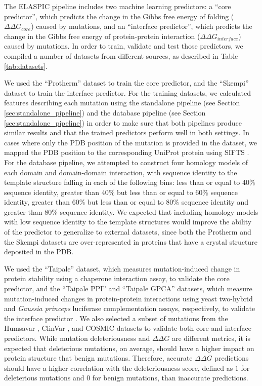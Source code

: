 The ELASPIC pipeline includes two machine learning predictors: a ``core predictor'', which predicts the change in the Gibbs free energy of folding ($\Delta \Delta G_{core}$) caused by mutations, and an ``interface predictor'', which predicts the change in the Gibbs free energy of protein-protein interaction ($\Delta \Delta G_{interface}$) caused by mutations. In order to train, validate and test those predictors, we compiled a number of datasets from different sources, as described in Table \ref{tab:datasets}.

We used the ``Protherm'' dataset to train the core predictor, and the ``Skempi'' dataset to train the interface predictor. For the training datasets, we calculated features describing each mutation using the standalone pipeline (see Section \ref{sec:standalone_pipeline}) and the database pipeline (see Section \ref{sec:standalone_pipeline}) in order to make sure that both pipelines produce similar results and that the trained predictors perform well in both settings. In cases where only the PDB position of the mutation is provided in the dataset, we mapped the PDB position to the corresponding UniProt protein using SIFTS \cite{velankar_sifts:_2013}. For the database pipeline, we attempted to construct four homology models of each domain and domain-domain interaction, with sequence identity to the template structure falling in each of the following bins: less than or equal to 40\% sequence identity, greater than 40\% but less than or equal to 60\% sequence identity, greater than 60\% but less than or equal to 80\% sequence identity and greater than 80\% sequence identity. We expected that including homology models with low sequence identity to the template structures would improve the ability of the predictor to generalize to external datasets, since both the Protherm and the Skempi datasets are over-represented in proteins that have a crystal structure deposited in the PDB.

We used the ``Taipale'' dataset, which measures mutation-induced change in protein stability using a chaperone interaction assay, to validate the core predictor, and the ``Taipale PPI'' and ``Taipale GPCA'' datasets, which measure mutation-induced changes in protein-protein interactions using yeast two-hybrid and \textit{Gaussia princeps} luciferase complementation assays, respectively, to validate the interface predictor \cite{sahni_widespread_2015}. We also selected a subset of mutations from the Humsavar \cite{consortium_uniprot:_2015}, ClinVar \cite{landrum_clinvar:_2016}, and COSMIC \cite{forbes_cosmic:_2015} datasets to validate both core and interface predictors. While mutation deleteriousness and $\Delta \Delta G$ are different metrics, it is expected that deleterious mutations, on average, should have a higher impact on protein structure that benign mutations. Therefore, accurate $\Delta \Delta G$ predictions should have a higher correlation with the deleteriousness score, defined as $1$ for deleterious mutations and $0$ for benign mutations, than inaccurate predictions.

